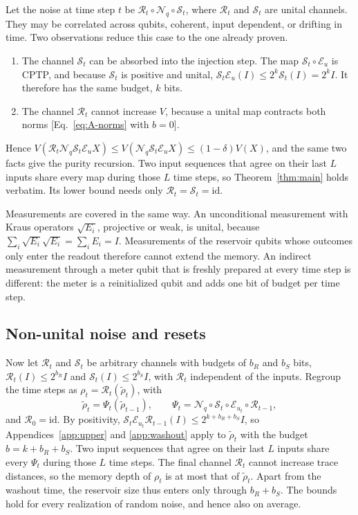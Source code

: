 \documentclass[aps,pra,reprint,superscriptaddress,floatfix]{revtex4-2}
\theoremstyle{plain}
\newcommand{\cE}{\mathcal E}
\newcommand{\Nq}{\mathcal N_q}
\begin{document}
Let the noise at time step $t$ be $\mathcal R_t\circ\Nq\circ\mathcal S_t$, where $\mathcal R_t$ and $\mathcal S_t$ are unital channels. They may be correlated across qubits, coherent, input dependent, or drifting in time. Two observations reduce this case to the one already proven.
\begin{enumerate}
\item The channel $\mathcal S_t$ can be absorbed into the injection step. The map $\mathcal S_t\circ\cE_u$ is CPTP, and because $\mathcal S_t$ is positive and unital, $\mathcal S_t\cE_u(I)\le2^k\mathcal S_t(I)=2^kI$. It therefore has the same budget, $k$ bits.
\item The channel $\mathcal R_t$ cannot increase $V$, because a unital map contracts both norms [Eq.~\eqref{eq:A-norms} with $b=0$].
\end{enumerate}
Hence $V(\mathcal R_t\Nq\mathcal S_t\cE_uX)\le V(\Nq\mathcal S_t\cE_uX)\le(1-\delta)V(X)$, and the same two facts give the purity recursion. Two input sequences that agree on their last $L$ inputs share every map during those $L$ time steps, so Theorem~\ref{thm:main} holds verbatim. Its lower bound needs only $\mathcal R_t=\mathcal S_t=\mathrm{id}$.

Measurements are covered in the same way. An unconditional measurement with Kraus operators $\sqrt{E_i}$, projective or weak, is unital, because $\sum_i\sqrt{E_i}\sqrt{E_i}=\sum_iE_i=I$. Measurements of the reservoir qubits whose outcomes only enter the readout therefore cannot extend the memory. An indirect measurement through a meter qubit that is freshly prepared at every time step is different: the meter is a reinitialized qubit and adds one bit of budget per time step.

\subsection{Non-unital noise and resets}

Now let $\mathcal R_t$ and $\mathcal S_t$ be arbitrary channels with budgets of $b_R$ and $b_S$ bits, $\mathcal R_t(I)\le2^{b_R}I$ and $\mathcal S_t(I)\le2^{b_S}I$, with $\mathcal R_t$ independent of the inputs. Regroup the time steps as $\rho_t=\mathcal R_t(\tilde\rho_t)$, with
\begin{equation}
\tilde\rho_t=\Psi_t(\tilde\rho_{t-1}),\qquad\Psi_t=\Nq\circ\mathcal S_t\circ\cE_{u_t}\circ\mathcal R_{t-1},
\end{equation}
and $\mathcal R_0=\mathrm{id}$. By positivity, $\mathcal S_t\cE_{u_t}\mathcal R_{t-1}(I)\le2^{k+b_R+b_S}I$, so Appendices~\ref{app:upper} and \ref{app:washout} apply to $\tilde\rho_t$ with the budget $b=k+b_R+b_S$. Two input sequences that agree on their last $L$ inputs share every $\Psi_t$ during those $L$ time steps. The final channel $\mathcal R_t$ cannot increase trace distances, so the memory depth of $\rho_t$ is at most that of $\tilde\rho_t$. Apart from the washout time, the reservoir size thus enters only through $b_R+b_S$. The bounds hold for every realization of random noise, and hence also on average.
\end{document}
